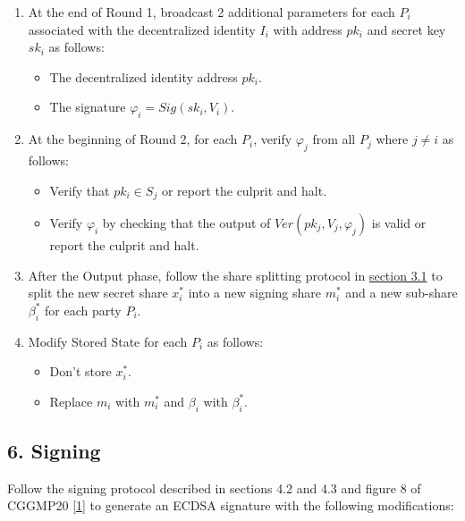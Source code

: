 \documentclass[
]{article}
\providecommand{\tightlist}{%
  \setlength{\itemsep}{0pt}\setlength{\parskip}{0pt}}
\begin{document}
\begin{enumerate}
\def\labelenumi{\arabic{enumi}.}
\tightlist
\item
  At the end of Round 1, broadcast 2 additional parameters for each
  \(P_i\) associated with the decentralized identity \(I_i\) with
  address \(pk_i\) and secret key \(sk_i\) as follows:

  \begin{itemize}
  \tightlist
  \item
    The decentralized identity address \(pk_i\).
  \item
    The signature \(\varphi _i = Sig(sk_i, V_i)\).
  \end{itemize}
\item
  At the beginning of Round 2, for each \(P_i\), verify \(\varphi _j\)
  from all \(P_j\) where \(j \neq i\) as follows:

  \begin{itemize}
  \tightlist
  \item
    Verify that \(pk_i \in S_j\) or report the culprit and halt.
  \item
    Verify \(\varphi _i\) by checking that the output of
    \(Ver(pk_j, V_j, \varphi _j)\) is valid or report the culprit and
    halt.
  \end{itemize}
\item
  After the Output phase, follow the share splitting protocol in
  \protect\hyperlink{share-splitting}{section 3.1} to split the new
  secret share \(x_i^\ast\) into a new signing share \(m_i^\ast\) and a
  new sub-share \(\beta _i^\ast\) for each party \(P_i\).
\item
  Modify Stored State for each \(P_i\) as follows:

  \begin{itemize}
  \tightlist
  \item
    Don't store \(x_i^\ast\).
  \item
    Replace \(m_i\) with \(m_i^\ast\) and \(\beta _i\) with
    \(\beta _i^\ast\).
  \end{itemize}
\end{enumerate}

\hypertarget{signing}{%
\subsection{6. Signing}\label{signing}}

Follow the signing protocol described in sections 4.2 and 4.3 and figure
8 of CGGMP20 {[}\protect\hyperlink{ref-cggmp20}{1}{]} to generate an
ECDSA signature with the following modifications:
\end{document}
